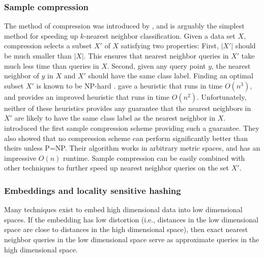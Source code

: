 \documentclass[../main.tex]{subfiles}
\begin{document}

\subsubsection{Sample compression}

The method of compression was introduced by \citet{hart1968condensed},
and is arguably the simplest method for speeding up $k$-nearest neighbor classification.
Given a data set $X$, compression selects a subset $X'$ of $X$ satisfying two properties:
First, $|X'|$ should be much smaller than $|X|$.
This ensures that nearest neighbor queries in $X'$ take much less time than queries in $X$.
Second, given any query point $y$, 
the nearest neighbor of $y$ in $X$ and $X'$ should have the same class label. 
Finding an optimal subset $X'$ is known to be NP-hard \citep{zukhba2010np}.
\citet{hart1968condensed} gave a heuristic that runs in time $O(n^3)$,
and \cite{angiulli2005fast} provides an improved heuristic that runs in time $O(n^2)$.
Unfortunately, neither of these heuristics provides any guarantee that the nearest neighbors in $X'$ are likely to have the same class label as the nearest neighbor in $X$.
\cite{gottlieb2014near} introduced the first sample compression scheme providing such a guarantee.
They also showed that no compression scheme can perform significantly better than theirs unless P=NP.
Their algorithm works in arbitrary metric spaces,
and has an impressive $O(n)$ runtime.
Sample compression can be easily combined with other techniques to further speed up nearest neighbor queries on the set $X'$.


\subsubsection{Embeddings and locality sensitive hashing}

Many techniques exist to embed high dimensional data into low dimensional spaces.
If the embedding has low distortion 
(i.e., distances in the low dimensional space are close to distances in the high dimensional space),
then exact nearest neighbor queries in the low dimensional space serve as approximate queries in the high dimensional space.
\end{document}
